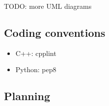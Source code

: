 \documentclass[a4paper, twoside]{article}
\begin{document}
TODO: more UML diagrams

\newpage

\subsection{Coding conventions}

\begin{itemize}
	\item{} C++: cpplint
	\item{} Python: pep8
\end{itemize}

\newpage

\subsection{Planning}
\end{document}
